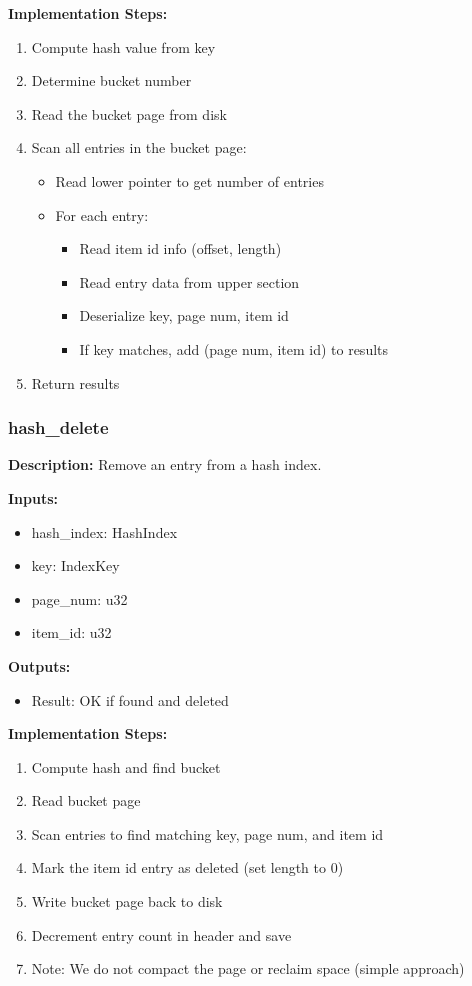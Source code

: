 \documentclass[11pt,a4paper]{article}
\begin{document}
\textbf{Implementation Steps:}
\begin{enumerate}
\item Compute hash value from key
\item Determine bucket number
\item Read the bucket page from disk
\item Scan all entries in the bucket page:
    \begin{itemize}
    \item Read lower pointer to get number of entries
    \item For each entry:
        \begin{itemize}
        \item Read item id info (offset, length)
        \item Read entry data from upper section
        \item Deserialize key, page num, item id
        \item If key matches, add (page num, item id) to results
        \end{itemize}
    \end{itemize}
\item Return results
\end{enumerate}

\subsubsection{hash\_delete}

\textbf{Description:} Remove an entry from a hash index.

\textbf{Inputs:}
\begin{itemize}
\item hash\_index: HashIndex
\item key: IndexKey
\item page\_num: u32
\item item\_id: u32
\end{itemize}

\textbf{Outputs:}
\begin{itemize}
\item Result: OK if found and deleted
\end{itemize}

\textbf{Implementation Steps:}
\begin{enumerate}
\item Compute hash and find bucket
\item Read bucket page
\item Scan entries to find matching key, page num, and item id
\item Mark the item id entry as deleted (set length to 0)
\item Write bucket page back to disk
\item Decrement entry count in header and save
\item Note: We do not compact the page or reclaim space (simple approach)
\end{enumerate}
\end{document}
